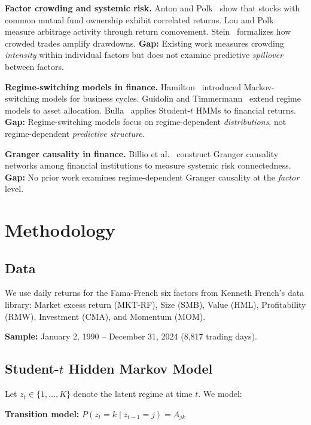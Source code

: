 \documentclass[sigconf]{acmart}
\begin{document}
\textbf{Factor crowding and systemic risk.}
Anton and Polk~\cite{anton2014connected} show that stocks with common mutual fund
ownership exhibit correlated returns. Lou and Polk~\cite{lou2022comomentum} measure
arbitrage activity through return comovement. Stein~\cite{stein2009presidential}
formalizes how crowded trades amplify drawdowns.
\textbf{Gap:} Existing work measures crowding \emph{intensity} within individual
factors but does not examine predictive \emph{spillover} between factors.

\textbf{Regime-switching models in finance.}
Hamilton~\cite{hamilton1989new} introduced Markov-switching models for business cycles.
Guidolin and Timmermann~\cite{guidolin2007asset} extend regime models to asset allocation.
Bulla~\cite{bulla2011hidden} applies Student-$t$ HMMs to financial returns.
\textbf{Gap:} Regime-switching models focus on regime-dependent \emph{distributions},
not regime-dependent \emph{predictive structure}.

\textbf{Granger causality in finance.}
Billio et al.~\cite{billio2012econometric} construct Granger causality networks among
financial institutions to measure systemic risk connectedness.
\textbf{Gap:} No prior work examines regime-dependent Granger causality at the
\emph{factor} level.

\section{Methodology}

\subsection{Data}

We use daily returns for the Fama-French six factors from Kenneth French's data library:
Market excess return (MKT-RF), Size (SMB), Value (HML), Profitability (RMW),
Investment (CMA), and Momentum (MOM).

\textbf{Sample:} January 2, 1990 -- December 31, 2024 (8,817 trading days).

\subsection{Student-$t$ Hidden Markov Model}
\label{sec:hmm}

Let $z_t \in \{1, \ldots, K\}$ denote the latent regime at time $t$. We model:

\textbf{Transition model:}
$P(z_t = k \mid z_{t-1} = j) = A_{jk}$
\end{document}

